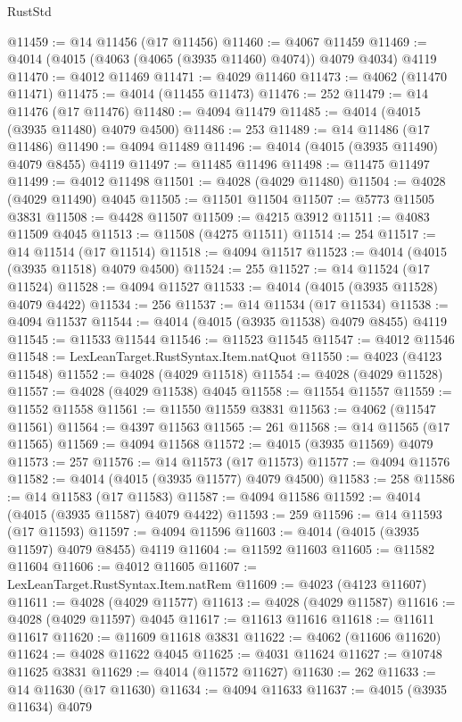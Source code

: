 \begin{lexlean}{RustStd}
\begin{coremodule}
@11459 := @14 @11456 (@17 @11456)
@11460 := @4067 @11459
@11469 := @4014 (@4015 (@4063 (@4065 (@3935 @11460) @4074)) @4079 @4034) @4119
@11470 := @4012 @11469
@11471 := @4029 @11460
@11473 := @4062 (@11470 @11471)
@11475 := @4014 (@11455 @11473)
@11476 := 252
@11479 := @14 @11476 (@17 @11476)
@11480 := @4094 @11479
@11485 := @4014 (@4015 (@3935 @11480) @4079 @4500)
@11486 := 253
@11489 := @14 @11486 (@17 @11486)
@11490 := @4094 @11489
@11496 := @4014 (@4015 (@3935 @11490) @4079 @8455) @4119
@11497 := @11485 @11496
@11498 := @11475 @11497
@11499 := @4012 @11498
@11501 := @4028 (@4029 @11480)
@11504 := @4028 (@4029 @11490) @4045
@11505 := @11501 @11504
@11507 := @5773 @11505 @3831
@11508 := @4428 @11507
@11509 := @4215 @3912
@11511 := @4083 @11509 @4045
@11513 := @11508 (@4275 @11511)
@11514 := 254
@11517 := @14 @11514 (@17 @11514)
@11518 := @4094 @11517
@11523 := @4014 (@4015 (@3935 @11518) @4079 @4500)
@11524 := 255
@11527 := @14 @11524 (@17 @11524)
@11528 := @4094 @11527
@11533 := @4014 (@4015 (@3935 @11528) @4079 @4422)
@11534 := 256
@11537 := @14 @11534 (@17 @11534)
@11538 := @4094 @11537
@11544 := @4014 (@4015 (@3935 @11538) @4079 @8455) @4119
@11545 := @11533 @11544
@11546 := @11523 @11545
@11547 := @4012 @11546
@11548 := LexLeanTarget.RustSyntax.Item.natQuot
@11550 := @4023 (@4123 @11548)
@11552 := @4028 (@4029 @11518)
@11554 := @4028 (@4029 @11528)
@11557 := @4028 (@4029 @11538) @4045
@11558 := @11554 @11557
@11559 := @11552 @11558
@11561 := @11550 @11559 @3831
@11563 := @4062 (@11547 @11561)
@11564 := @4397 @11563
@11565 := 261
@11568 := @14 @11565 (@17 @11565)
@11569 := @4094 @11568
@11572 := @4015 (@3935 @11569) @4079
@11573 := 257
@11576 := @14 @11573 (@17 @11573)
@11577 := @4094 @11576
@11582 := @4014 (@4015 (@3935 @11577) @4079 @4500)
@11583 := 258
@11586 := @14 @11583 (@17 @11583)
@11587 := @4094 @11586
@11592 := @4014 (@4015 (@3935 @11587) @4079 @4422)
@11593 := 259
@11596 := @14 @11593 (@17 @11593)
@11597 := @4094 @11596
@11603 := @4014 (@4015 (@3935 @11597) @4079 @8455) @4119
@11604 := @11592 @11603
@11605 := @11582 @11604
@11606 := @4012 @11605
@11607 := LexLeanTarget.RustSyntax.Item.natRem
@11609 := @4023 (@4123 @11607)
@11611 := @4028 (@4029 @11577)
@11613 := @4028 (@4029 @11587)
@11616 := @4028 (@4029 @11597) @4045
@11617 := @11613 @11616
@11618 := @11611 @11617
@11620 := @11609 @11618 @3831
@11622 := @4062 (@11606 @11620)
@11624 := @4028 @11622 @4045
@11625 := @4031 @11624
@11627 := @10748 @11625 @3831
@11629 := @4014 (@11572 @11627)
@11630 := 262
@11633 := @14 @11630 (@17 @11630)
@11634 := @4094 @11633
@11637 := @4015 (@3935 @11634) @4079

\end{coremodule}
\end{lexlean}
